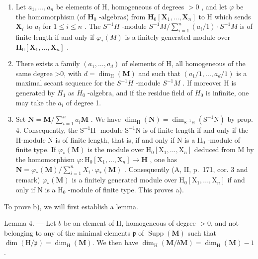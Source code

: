 \begin{enumerate}
\def\labelenumi{\alph{enumi})}
\item
  Let \(a_1, \ldots, a_n\) be elements of H, homogeneous of degrees \(> 0\) , and let \(\varphi\) be the homomorphism (of \(\mathbf{H}_0\) -algebras) from \(\mathbf{H}_0[\mathbf{X}_1, \ldots, \mathbf{X}_n]\) to H which sends \(\mathbf{X}_i\) to \(a_i\) for \(1 \leqslant i \leqslant n\) . The \(S^{-1}H\) -module \(S^{-1}M / \sum_{i=1}^{n}(a_i/1) \cdot S^{-1}M\) is of finite length if and only if \(\varphi_*(M)\) is a finitely generated module over \(\mathbf{H}_0[\mathbf{X}_1, \ldots, \mathbf{X}_n]\) .
\item
  There exists a family \((a_{1},...,a_{d})\) of elements of H, all homogeneous of the same degree \textgreater0, with \(d=\dim_{\mathrm{H}}(\mathbf{M})\) and such that \((a_{1}/1,...,a_{d}/1)\) is a maximal secant sequence for the \(S^{-1}H\) -module \(S^{-1}M\) . If moreover H is generated by \(H_{1}\) as \(H_{0}\) -algebra, and if the residue field of \(H_{0}\) is infinite, one may take the \(a_{i}\) of degree 1.
\item
  Set \(\mathbf{N} = \mathbf{M} / \sum_{i=1}^{n} a_i \mathbf{M}\) . We have \(\dim_{\mathrm{H}}(\mathbf{N}) = \dim_{\mathrm{S}^{-1}\mathrm{H}}(\mathrm{S}^{-1}\mathrm{N})\) by prop. 4. Consequently, the \(\mathrm{S}^{-1}\mathrm{H}\) -module \(\mathrm{S}^{-1}\mathrm{N}\) is of finite length if and only if the H-module N is of finite length, that is, if and only if N is a \(\mathrm{H}_0\) -module of finite type. If \(\varphi_*(\mathbf{M})\) is the module over \(\mathrm{H}_0[\mathrm{X}_1, ..., \mathrm{X}_n]\) deduced from M by the homomorphism \(\varphi : \mathrm{H}_0[\mathrm{X}_1, ..., \mathrm{X}_n] \to \mathbf{H}\) , one has \(\mathbf{N} = \varphi_*(\mathbf{M}) / \sum_{i=1}^{n} X_i \cdot \varphi_*(\mathbf{M})\) . Consequently (A, II, p.~171, cor. 3 and remark) \(\varphi_*(\mathbf{M})\) is a finitely generated module over \(\mathrm{H}_0[\mathrm{X}_1, ..., \mathrm{X}_n]\) if and only if N is a \(\mathrm{H}_0\) -module of finite type. This proves a).
\end{enumerate}

To prove b), we will first establish a lemma.

Lemma 4. --- Let \(b\) be an element of H, homogeneous of degree \(>0\), and not belonging to any of the minimal elements \(\mathfrak{p}\) of \(\operatorname{Supp}(\mathbf{M})\) such that \(\dim(\mathrm{H}/\mathfrak{p}) = \dim_{\mathrm{H}}(\mathbf{M})\). We then have \(\dim_{\mathrm{H}}(\mathbf{M}/b\mathbf{M}) = \dim_{\mathrm{H}}(\mathbf{M}) - 1\).

